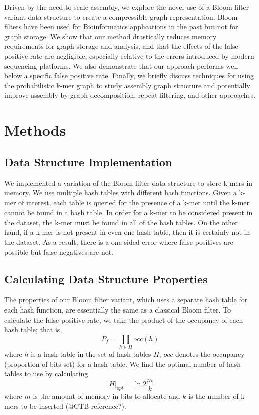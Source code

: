 \documentclass[12pt]{article} \usepackage{simplemargins}
\begin{document}
Driven by the need to scale assembly, we explore the novel use of a 
Bloom filter variant data structure to create a compressible graph 
representation. Bloom filters\cite{bloom} have been used for 
Bioinformatics applications 
in the past\cite{pmid20472541, haskell, pmid20426693} but not for graph 
storage.
We show that our method drastically
reduces memory requirements for graph storage and analysis, and that the effects
of the false positive rate are negligible, especially relative to the errors
introduced by modern sequencing platforms.
We also demonstrate that our 
approach performs well below a specific false positive rate. Finally, we 
briefly discuss techniques for using the probabilistic k-mer graph 
to study assembly graph structure and potentially improve assembly by 
graph decomposition, repeat filtering, and other approaches.

\section{Methods}

\subsection{Data Structure Implementation}
We implemented a variation of the Bloom filter data structure to store k-mers
in memory. We use multiple hash tables with different hash functions. 
Given a k-mer of interest, each table is queried for the
presence of a k-mer until the k-mer cannot be found in a hash
table. In order for a k-mer to be considered present in the dataset, 
the k-mer must be found in all of the hash tables. On the other hand, 
if a k-mer is not present in even one hash table, then it is certainly 
not in the dataset. As a result, there is a one-sided error where 
false positives are possible but false negatives are not.

\subsection{Calculating Data Structure Properties}
The properties of our Bloom filter variant, which 
uses a separate hash table for each hash function, are essentially the 
same as a classical Bloom filter. To calculate the false positive rate, we 
take the product of the occupancy of each hash table; that is,
\begin{displaymath}
P_f = \prod_{h \in H} occ(h)
\end{displaymath}
where $h$ is a hash table in the set of hash tables $H$, $occ$ denotes 
the occupancy (proportion of bits set) for a hash table.
We find the optimal number of hash tables 
to use by calculating
\begin{displaymath}
\vert H \vert_{opt} = \ln 2 \frac{m}{k}
\end{displaymath}
where $m$ is the amount of memory in bits to allocate and $k$ 
is the number of k-mers to be inserted (@CTB reference?).
\end{document}
